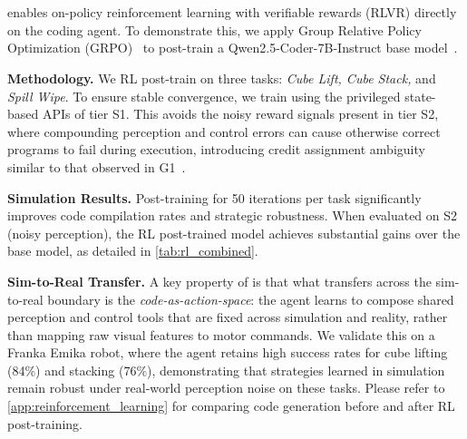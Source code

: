 \section{\rlname{}}


\gymname{} enables on-policy reinforcement learning with verifiable rewards (RLVR) directly on the coding agent. To demonstrate this, we apply Group Relative Policy Optimization (GRPO)~\cite{shao2024deepseekmath, guo2025deepseek} to post-train a Qwen2.5-Coder-7B-Instruct base model~\cite{hui2024qwen2}.

\textbf{Methodology.} We RL post-train on three tasks: \textit{Cube Lift, Cube Stack,} and \textit{Spill Wipe}. To ensure stable convergence, we train using the privileged state-based APIs of tier S1. This avoids the noisy reward signals present in tier S2, where compounding perception and control errors can cause otherwise correct programs to fail during execution, introducing credit assignment ambiguity similar to that observed in G1~\cite{chen2025g1}. 

\caprltab{}
\textbf{Simulation Results.} Post-training for 50 iterations per task significantly improves code compilation rates and strategic robustness. When evaluated on S2 (noisy perception), the RL post-trained model achieves substantial gains over the base model, as detailed in \cref{tab:rl_combined}.

\textbf{Sim-to-Real Transfer.} A key property of \rlname{} is that what transfers across the sim-to-real boundary is the \emph{code-as-action-space}: the agent learns to compose shared perception and control tools that are fixed across simulation and reality, rather than mapping raw visual features to motor commands. We validate this on a Franka Emika robot, where the agent retains high success rates for cube lifting (84\%) and stacking (76\%), demonstrating that strategies learned in simulation remain robust under real-world perception noise on these tasks. Please refer to \cref{app:reinforcement_learning} for comparing code generation before and after RL post-training.


